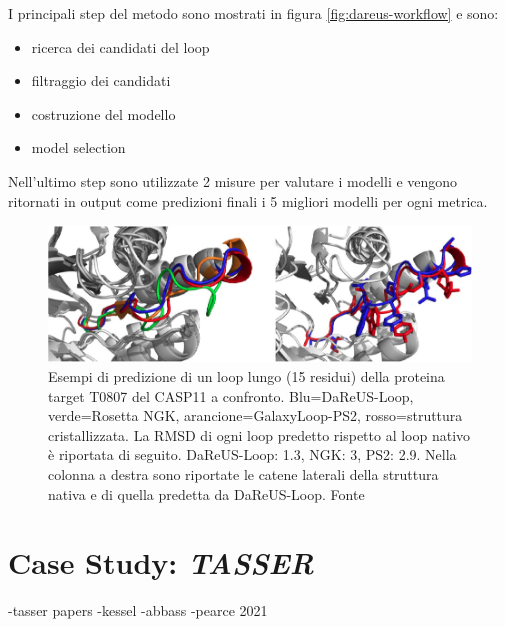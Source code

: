 {I principali step del metodo sono mostrati in figura \ref{fig:dareus-workflow} e sono:
\begin{itemize}
	\item ricerca dei candidati del loop
	\item filtraggio dei candidati
	\item costruzione del modello
	\item model selection
\end{itemize}

Nell'ultimo step sono utilizzate 2 misure per valutare i modelli e vengono ritornati in output come predizioni finali i 5 migliori modelli per ogni metrica.

\begin{figure}[!htb]
	\centering
	\includegraphics[scale=0.63]{images/dareus-confronto.png}
	\caption{Esempi di predizione di un loop lungo (15 residui) della proteina target T0807 del CASP11 a confronto. Blu=DaReUS-Loop, verde=Rosetta NGK, arancione=GalaxyLoop-PS2, rosso=struttura cristallizzata. La RMSD di ogni loop predetto rispetto al loop nativo è riportata di seguito. DaReUS-Loop: 1.3\angstrom, NGK: 3\angstrom, PS2: 2.9\angstrom. Nella colonna a destra sono riportate le catene laterali della struttura nativa e di quella predetta da DaReUS-Loop. Fonte\cite{karami2018dareus}}
	\label{fig:}
\end{figure}

}

\section{Case Study: \textit{TASSER}}
-tasser papers
-kessel
-abbass
-pearce 2021


